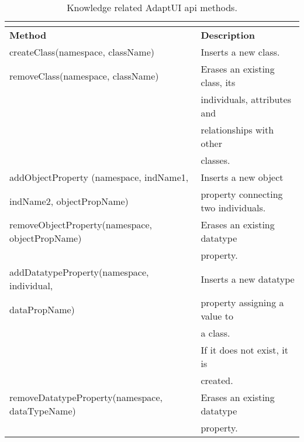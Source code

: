 \begin{center}
\footnotesize
\begin{longtable}{l l}
  \caption{Knowledge related AdaptUI \ac{api} methods.}\\
  \label{tbl:api_knowledge} \\
  \hline 
  \textbf{Method}		& \textbf{Description}\\
  \hline
  createClass(namespace, className)	& Inserts a new class.		\\
  removeClass(namespace, className)	& Erases an existing class, its	\\
					& individuals, attributes and	\\
					& relationships with other 	\\
					& classes.			\\
  \hline 
  addObjectProperty	(namespace, indName1,& Inserts a new object\\
  indName2, objectPropName)	& property connecting two individuals.\\
  removeObjectProperty(namespace, objectPropName)& Erases an existing datatype\\
 					& property.			\\
  \hline 
  addDatatypeProperty(namespace, individual,& Inserts a new datatype\\
  dataPropName)				& property assigning a value to \\
 					& a class.			\\
					& If it does not exist, it is	\\
					& created.			\\
  removeDatatypeProperty(namespace, dataTypeName)& Erases an existing datatype\\
 					& property.			\\

\end{longtable}
\end{center}
